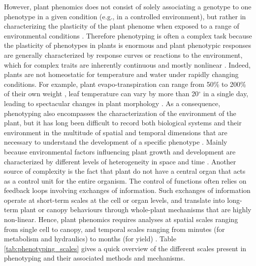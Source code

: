 However, plant phenomics does not consist of solely associating a genotype to one phenotype in a given condition (e.g., in a controlled
environment), but rather in characterizing the plasticity of the
plant phenome when exposed to a range of environmental conditions \parencite{tardieu_plant_2017}. Therefore phenotyping is often a complex task because the plasticity of phenotypes in plants is enormous and plant phenotypic responses are generally characterized by response curves or reactions to the environment, which for complex traits are inherently continuous and mostly nonlinear \parencite{sultan2003phenotypic}. Indeed, plants are not homeostatic for temperature and water under rapidly changing conditions. For example, plant evapo-transpiration can range from 50\% to 200\% of their own weight \parencite{vadez2014transpiration}, leaf temperature can vary by more than 20$^{\circ}$ in a single day, leading to spectacular changes in plant morphology \parencite{caldeira2014hydraulic}. As a consequence, phenotyping also encompasses the characterization of the environment of the plant, but it has long been difficult to record both biological systems and their environment in the multitude of spatial and temporal dimensions that are necessary to understand
the development of a specific phenotype \parencite{pieruschka2019plant}. Mainly because environmental factors influencing plant growth and development are characterized by different levels of heterogeneity in space and time \parencite{hodge2004plastic}.
Another source of complexity is the fact that plant do not have a central organ that acts as a control unit for the entire organism. The control of functions often relies on feedback loops involving exchanges of information. Such exchanges of information operate at short-term scales at the cell or organ levels, and translate into long-term plant or canopy behaviours through whole-plant mechanisms that are highly non-linear. Hence, plant phenomics requires analyses at spatial scales ranging from single cell to canopy, and temporal scales ranging from minutes (for metabolism and hydraulics) to months (for yield) \parencite{tardieu_plant_2017}. Table \ref{tab:phenotyping_scales} gives a quick overview of the different scales present in phenotyping and their associated methods and mechanisms.


